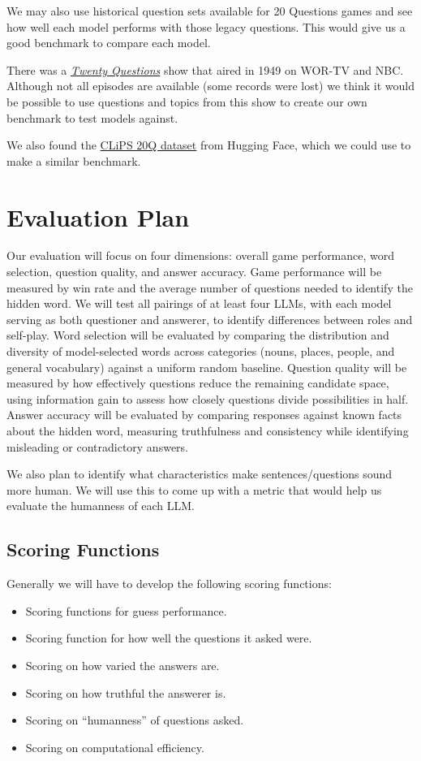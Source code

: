 \documentclass[10pt]{article}
\begin{document}
We may also use historical question sets available for 20 Questions games and
see how well each model performs with those legacy questions. This would give
us a good benchmark to compare each model.

There was a \textit{\hyperlink{ref-imdb}{Twenty Questions}} show that aired in 1949 on WOR-TV and
NBC. Although not all episodes are available (some records were lost) we think
it would be possible to use questions and topics from this show to create our
own benchmark to test models against.

We also found the \hyperlink{ref-clips}{CLiPS 20Q dataset} from Hugging Face, which we could use to
make a similar benchmark.

\section{Evaluation Plan}

Our evaluation will focus on four dimensions: overall game performance, word
selection, question quality, and answer accuracy. Game performance will be
measured by win rate and the average number of questions needed to identify
the hidden word. We will test all pairings of at least four LLMs, with each
model serving as both questioner and answerer, to identify differences between
roles and self-play. Word selection will be evaluated by comparing the
distribution and diversity of model-selected words across categories (nouns,
places, people, and general vocabulary) against a uniform random baseline.
Question quality will be measured by how effectively questions reduce the
remaining candidate space, using information gain to assess how closely
questions divide possibilities in half. Answer accuracy will be evaluated by
comparing responses against known facts about the hidden word, measuring
truthfulness and consistency while identifying misleading or contradictory
answers.

We also plan to identify what characteristics make sentences/questions sound
more human. We will use this to come up with a metric that would help us
evaluate the humanness of each LLM.

\subsection*{Scoring Functions}

Generally we will have to develop the following scoring functions:

\begin{itemize}[leftmargin=*]
    \item Scoring functions for guess performance.
    \item Scoring function for how well the questions it asked were.
    \item Scoring on how varied the answers are.
    \item Scoring on how truthful the answerer is.
    \item Scoring on ``humanness'' of questions asked.
    \item Scoring on computational efficiency.
\end{itemize}
\end{document}
